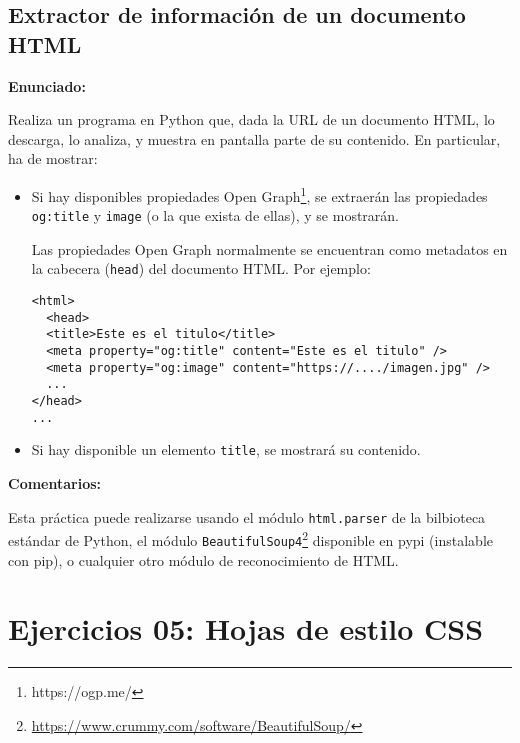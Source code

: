 \subsection{Extractor de información de un documento HTML}
\label{subsec:html-extractor}

\textbf{Enunciado:}

Realiza un programa en Python que, dada la URL de un documento HTML, lo descarga, lo analiza, y muestra en pantalla parte de su contenido. En particular, ha de mostrar:

\begin{itemize}
\item Si hay disponibles propiedades Open Graph\footnote{https://ogp.me/}, se extraerán las propiedades \texttt{og:title} y \texttt{image} (o la que exista de ellas), y se mostrarán.

  Las propiedades Open Graph normalmente se encuentran como metadatos en la cabecera (\texttt{head}) del documento HTML. Por ejemplo:

\begin{verbatim}
<html>
  <head>
  <title>Este es el titulo</title>
  <meta property="og:title" content="Este es el titulo" />
  <meta property="og:image" content="https://..../imagen.jpg" />
  ...
</head>
...
\end{verbatim}

\item Si hay disponible un elemento \texttt{title}, se mostrará su contenido.
\end{itemize}

\textbf{Comentarios:}

Esta práctica puede realizarse usando el módulo \texttt{html.parser} de la bilbioteca estándar de Python, el módulo \texttt{BeautifulSoup4}\footnote{\url{https://www.crummy.com/software/BeautifulSoup/}} disponible en pypi (instalable con pip), o cualquier otro módulo de reconocimiento de HTML.

\section{Ejercicios 05: Hojas de estilo CSS}


